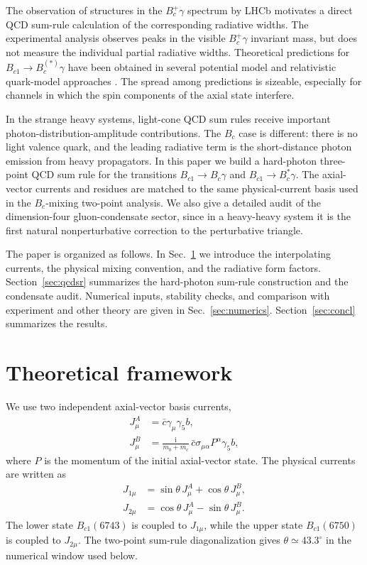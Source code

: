 \documentclass[aps,prd,preprint,nofootinbib,superscriptaddress]{revtex4-2}
\newcommand{\ii}{\mathrm{i}}
\newcommand{\Bc}{B_c}
\newcommand{\Bcst}{B_c^\ast}
\newcommand{\Bcone}{B_{c1}}
\begin{document}
The observation of structures in the \(B_c^+\gamma\) spectrum by LHCb
\cite{LHCbBc1PObservation2025,LHCbBc1PStudy2025} motivates a direct QCD
sum-rule calculation of the corresponding radiative widths.  The experimental
analysis observes peaks in the visible \(B_c^+\gamma\) invariant mass, but does
not measure the individual partial radiative widths.  Theoretical predictions
for \(B_{c1}\to B_c^{(\ast)}\gamma\) have been obtained in several potential
model and relativistic quark-model approaches
\cite{Godfrey2004,Ebert2003,Fulcher1999,Gershtein1995,LiTang2023,
LiZhong2019,LiLiu2023,EichtenQuigg2018,BondarMilstein2025}.  The spread among
predictions is sizeable, especially for channels in which the spin components
of the axial state interfere.

In the strange heavy systems, light-cone QCD sum rules receive important
photon-distribution-amplitude contributions.  The \(B_c\) case is different:
there is no light valence quark, and the leading radiative term is the
short-distance photon emission from heavy propagators.  In this paper we build
a hard-photon three-point QCD sum rule for the transitions
\(\Bcone\to \Bc\gamma\) and \(\Bcone\to \Bcst\gamma\).  The axial-vector
currents and residues are matched to the same physical-current basis used in
the \(B_c\)-mixing two-point analysis.  We also give a detailed audit of the
dimension-four gluon-condensate sector, since in a heavy-heavy system it is the
first natural nonperturbative correction to the perturbative triangle.

The paper is organized as follows.  In Sec.~\ref{sec:framework} we introduce
the interpolating currents, the physical mixing convention, and the radiative
form factors.  Section~\ref{sec:qcdsr} summarizes the hard-photon sum-rule
construction and the condensate audit.  Numerical inputs, stability checks,
and comparison with experiment and other theory are given in
Sec.~\ref{sec:numerics}.  Section~\ref{sec:concl} summarizes the results.

\section{Theoretical framework}
\label{sec:framework}

We use two independent axial-vector basis currents,
\begin{align}
  J^A_\mu &= \bar c \gamma_\mu\gamma_5 b,\\
  J^B_\mu &= \frac{\ii}{m_b+m_c}\,
  \bar c\sigma_{\mu\alpha}P^\alpha\gamma_5 b ,
  \label{eq:basis-currents}
\end{align}
where \(P\) is the momentum of the initial axial-vector state.  The physical
currents are written as
\begin{align}
  J_{1\mu} &= \sin\theta\,J^A_\mu+\cos\theta\,J^B_\mu,\\
  J_{2\mu} &= \cos\theta\,J^A_\mu-\sin\theta\,J^B_\mu .
  \label{eq:physical-currents}
\end{align}
The lower state \(\Bcone(6743)\) is coupled to \(J_{1\mu}\), while the upper
state \(\Bcone(6750)\) is coupled to \(J_{2\mu}\).  The two-point sum-rule
diagonalization gives \(\theta\simeq43.3^\circ\) in the numerical window used
below.
\end{document}
